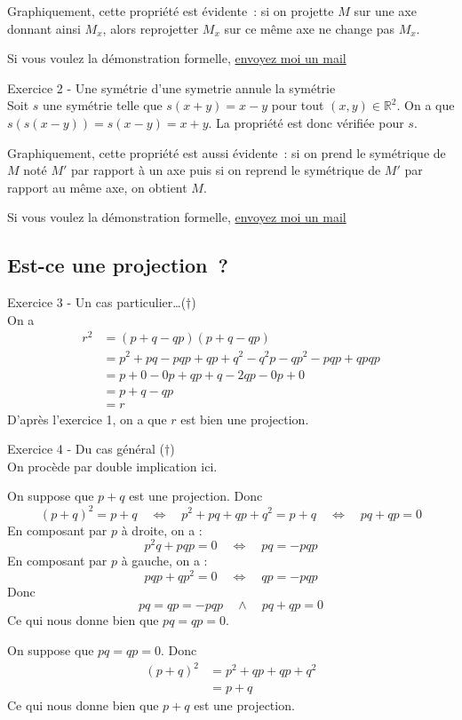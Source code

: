 \documentclass[a4paper, titlepage]{article}
\newenvironment{lititle}%
{\vspace{7mm}\LobsterTwo \large}%
{\\}
\begin{document}
	Graphiquement, cette propriété est évidente~: si on projette $M$ sur une axe donnant ainsi $M_x$, alors reprojetter $M_x$ sur ce même axe ne change pas $M_x$.

	Si vous voulez la démonstration formelle, \href{mailto:william.herges@etu.sorbonne-universite.fr}{envoyez moi un mail}

	\begin{lititle}
		Exercice 2 - Une symétrie d'une symetrie annule la symétrie
	\end{lititle}
	Soit $s$ une symétrie telle que $s(x+y) = x-y$ pour tout $(x,y)\in\mathbb{R}^2$. On a que $s(s(x-y)) = s(x-y) = x+y$. La propriété est donc vérifiée pour $s$.

	Graphiquement, cette propriété est aussi évidente~: si on prend le symétrique de $M$ noté $M'$ par rapport à un axe puis si on reprend le symétrique de $M'$ par rapport au même axe, on obtient $M$.

	Si vous voulez la démonstration formelle, \href{mailto:william.herges@etu.sorbonne-universite.fr}{envoyez moi un mail}
	\subsection{Est-ce une projection~?}
	\begin{lititle}
		Exercice 3 - Un cas particulier\ldots ($\dagger$)
	\end{lititle}
	On a
	\begin{align*}
		r^2 &= (p+q-qp)(p+q-qp) \\
		&= p^2 + pq - pqp + qp + q^2 - q^2p - qp^2 - pqp + qpqp \\
		&= p + 0 - 0p + qp + q - 2qp - 0p + 0 \\
		&= p + q - qp \\
		&= r
	\end{align*}
	D'après l'exercice 1, on a que $r$ est bien une projection.
	
	\begin{lititle}
		Exercice 4 - Du cas général ($\dagger$)
	\end{lititle}
	On procède par double implication ici.

	\fbox{$\implies$} On suppose que $p+q$ est une projection. Donc 
	$$(p+q)^2 = p+q \quad\iff\quad p^2+pq+qp+q^2 = p+q \quad\iff\quad pq+qp = 0$$
	En composant par $p$ à droite, on a : $$ p^2q+pqp = 0\quad\iff\quad pq = -pqp$$
	En composant par $p$ à gauche, on a : $$ pqp+qp^2 = 0\quad\iff\quad qp = -pqp $$
	Donc $$ pq = qp = -pqp\quad\land\quad pq+qp = 0 $$
	Ce qui nous donne bien que $pq = qp = 0$.

	\fbox{$\impliedby$} On suppose que $pq=qp=0$. Donc
	\begin{align*}
		(p+q)^2 &= p^2+qp+qp+q^2 \\
		&= p+q
	\end{align*}
	Ce qui nous donne bien que $p+q$ est une projection.
\end{document}
